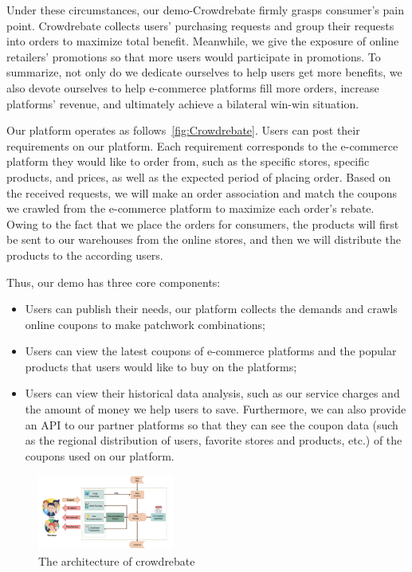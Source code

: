 Under these circumstances, our demo-Crowdrebate firmly grasps consumer's pain point. Crowdrebate collects users’
purchasing requests and group their requests into orders to
maximize total benefit. Meanwhile, we give the exposure of online retailers' promotions so that more users would participate in promotions. To summarize, not only do we dedicate ourselves to help users get more benefits, we also devote ourselves to help e-commerce platforms fill more orders, increase platforms’ revenue, and ultimately achieve a bilateral win-win situation.

Our platform operates as follows~\ref{fig:Crowdrebate}. Users can post their requirements on our platform. Each requirement corresponds to the e-commerce platform they would like to order from, such as the specific stores, specific products, and prices, as well as the expected period of placing order. Based on the received requests, we will make an order association and match the coupons we crawled from the e-commerce platform to maximize each order's rebate. Owing to the fact that we place the orders for consumers, the products will first be sent to our warehouses from the online stores, and then we will distribute the products to the according users.

Thus, our demo has three core components: 
\begin{itemize}
	\item Users can publish their needs, our platform collects the demands and crawls online coupons to make patchwork combinations;
	\item Users can view the latest coupons of e-commerce platforms and the popular products that users would like to buy on the platforms;
	\item Users can view their historical data analysis, such as our service charges and the amount of money we help users to save. Furthermore, we can also provide an API to our partner platforms so that they can see the coupon data (such as the regional distribution of users, favorite stores and products, etc.) of the coupons used on our platform.
\end{itemize}
\begin{figure}[t] 
	\centering %
	\includegraphics[width=0.4\textwidth]{../figure/ar.png} %
	\caption{The architecture of crowdrebate} %
	\label{fig:ar} %
\end{figure}

